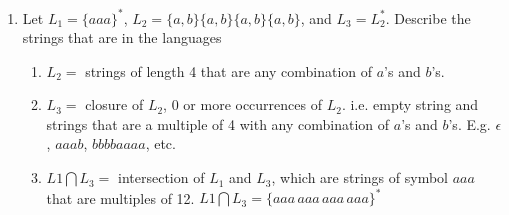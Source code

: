 \documentclass[10pt,a4paper,final]{article}
\begin{document}
\begin{enumerate}
\item %
Let $L_1 = \{aaa\}^*$, $L_2 = \{a,b\}\{a,b\}\{a,b\}\{a,b\}$, and $L_3 = L_2^*$.
Describe the strings that are in the languages
\begin{enumerate}
  \item $L_2 =$ strings of length 4 that are any combination of $a$'s and $b$'s.
  \item $L_3 =$ closure of $L_2$, 0 or more occurrences of $L_2$.
  i.e. empty string and strings that are a multiple of 4 with any combination of $a$'s and $b$'s.
  E.g. $\epsilon$, $aaab$, $bbbbaaaa$, etc.
  \item $L1 \bigcap L_3 =$ intersection of $L_1$ and $L_3$, which are strings of symbol $aaa$
  that are multiples of 12. $L1 \bigcap L_3 = \{aaa\,aaa\,aaa\,aaa\}^*$
\end{enumerate}
\end{enumerate}
\end{document}

